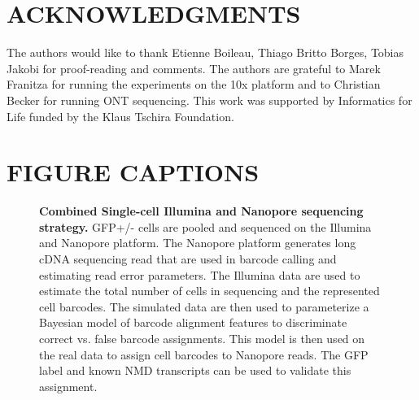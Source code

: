 \documentclass[times, 11pt, a4paper]{article}
\begin{document}
\section*{ACKNOWLEDGMENTS}
  The authors would like to thank Etienne Boileau, Thiago Britto Borges, Tobias Jakobi for proof-reading and comments.
  The authors are grateful to Marek Franitza for running the experiments on the 10x platform and to Christian Becker for running ONT sequencing.
  This work was supported by Informatics for Life funded by the Klaus Tschira Foundation.

 

\newpage

\section*{FIGURE CAPTIONS}

  \begin{figure}[h!]
  \caption{\textbf{Combined Single-cell Illumina and Nanopore sequencing strategy.} GFP+/- cells are pooled and sequenced on the Illumina and Nanopore platform. The Nanopore platform generates long cDNA sequencing read that are used in barcode calling and estimating read error parameters. The Illumina data are used to estimate the total number of cells in sequencing and the represented cell barcodes. The simulated data are then used to parameterize a Bayesian model of barcode alignment features to discriminate correct vs. false barcode assignments. This model is then used on the real data to assign cell barcodes to Nanopore reads. The GFP label and known NMD transcripts can be used to validate this assignment. }
  \label{fig:graphicsummary}
      \end{figure}
\end{document}
